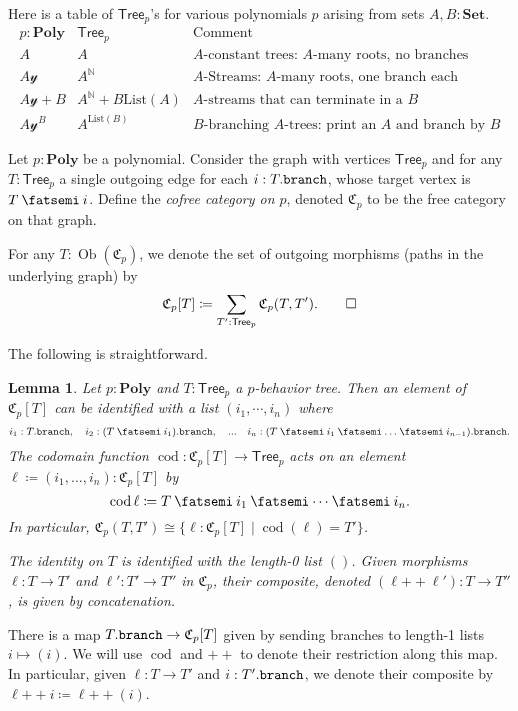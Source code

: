 \documentclass[11pt, one side, article]{memoir}
\theoremstyle{definition}
\theoremstyle{plain}
\newtheorem{lemma}[definitionx]{Lemma}
\newenvironment{example}
  {\pushQED{\qed}\renewcommand{\qedsymbol}{$\lozenge$}\examplex}
  {\popQED\endexamplex}
\newenvironment{definition}
  {\pushQED{\qed}\renewcommand{\qedsymbol}{$\lozenge$}\definitionx}
  {\popQED\enddefinitionx}
\DeclareMathOperator{\cod}{cod}
\DeclareMathOperator{\ob}{Ob}
\newcommand{\Set}[1]{\mathsf{#1}}%
\newcommand{\Cat}[1]{\mathbf{#1}}%
\newcommand{\Fun}[1]{\mathrm{#1}}%
\newcommand{\then}{\mathbin{\fatsemi}}
\newcommand{\tn}[1]{\textnormal{#1}}
\newcommand{\nn}{\mathbb{N}}
\newcommand{\smset}{\Cat{Set}}
\newcommand{\List}{\Fun{List}}
\newcommand{\plpl}{\mathbin{+\!\!+}}
\newcommand{\yon}{\mathcal{y}}
\newcommand{\poly}{\Cat{Poly}}
\newcommand{\Cofree}{\mathfrak{C}}
\newcommand{\tree}{\Set{Tree}}
\newcommand{\br}{\tn{\texttt{branch}}}
\begin{document}
\begin{example}
Here is a table of $\tree_p$'s for various polynomials $p$ arising from sets $A,B:\smset$.
\[
\begin{array}{l|l|l}
p:\poly&\tree_p&\text{Comment}\\\hline
A&A&\text{$A$-constant trees: $A$-many roots, no branches}\\
A\yon&A^\nn&\text{$A$-Streams: $A$-many roots, one branch each}\\
A\yon+B&A^\nn+B\List(A)&\text{$A$-streams that can terminate in a $B$}\\
A\yon^B&A^{\List(B)}&\text{$B$-branching $A$-trees: print an $A$ and branch by $B$}
\end{array}
\]
\end{example}

\begin{definition}[Cofree category $\Cofree_p$]
Let $p:\poly$ be a polynomial. Consider the graph with vertices $\tree_p$ and for any $T:\tree_p$ a single outgoing edge for each $i:T.\br$, whose target vertex is $T\then i$. Define the \emph{cofree category on $p$}, denoted $\Cofree_p$ to be the free category on that graph.

For any $T:\ob(\Cofree_p)$, we denote the set of outgoing morphisms (paths in the underlying graph) by
\[
\Cofree_p[T]\coloneqq\sum_{T':\tree_p}\Cofree_p(T,T').
\qedhere
\]
\end{definition}

The following is straightforward.
\begin{lemma}
Let $p:\poly$ and $T:\tree_p$ a $p$-behavior tree. Then an element of $\Cofree_p[T]$ can be identified with a list $(i_1,\cdots,i_n)$ where
\[
i_1:T.\br,\quad
i_2:(T\then i_1).\br,\quad...\quad
i_n:(T\then i_1\then\ldots\then i_{n-1}).\br.
\]
The codomain function $\cod\colon\Cofree_p[T]\to\tree_p$ acts on an element $\ell\coloneqq(i_1,\ldots,i_n):\Cofree_p[T]$ by 
\[
\cod\ell\coloneqq T\then i_1\then\cdots\then i_n.
\]
In particular, $\Cofree_p(T,T')\cong\{\ell\colon\Cofree_p[T]\mid\cod(\ell)=T'\}$. 

The identity on $T$ is identified with the length-0 list $()$. Given morphisms $\ell\colon T\to T'$ and $\ell'\colon T'\to T''$ in $\Cofree_p$, their composite, denoted $(\ell\plpl\ell')\colon T\to T''$, is given by concatenation.
\end{lemma}

There is a map $T.\br\to\Cofree_p[T]$ given by sending branches to length-1 lists $i\mapsto (i)$. We will use $\cod$ and $\plpl$ to denote their restriction along this map. In particular, given $\ell\colon T\to T'$ and $i:T'.\br$, we denote their composite by $\ell\plpl i\coloneqq\ell\plpl(i)$.
\end{document}
